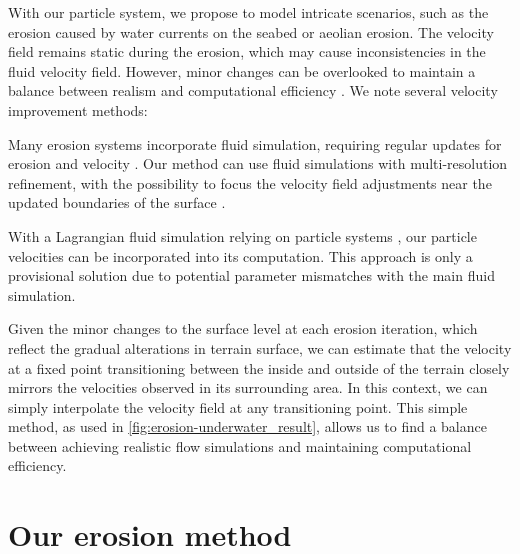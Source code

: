 
With our particle system, we propose to model intricate scenarios, such as the erosion caused by water currents on the seabed or aeolian erosion. The velocity field remains static during the erosion, which may cause inconsistencies in the fluid velocity field. However, minor changes can be overlooked to maintain a balance between realism and computational efficiency \cite{Tychonievich2010}. We note several velocity improvement methods: 
\begin{Itemize}
     Many erosion systems incorporate fluid simulation, requiring regular updates for erosion and velocity \cite{Kristof2009, Wojtan2007}. Our method can use fluid simulations with multi-resolution refinement, with the possibility to focus the velocity field adjustments near the updated boundaries of the surface \cite{Roose2011}. 
    
     With a Lagrangian fluid simulation relying on particle systems \cite{Koschier2022}, our particle velocities can be incorporated into its computation. This approach is only a provisional solution due to potential parameter mismatches with the main fluid simulation. 

     Given the minor changes to the surface level at each erosion iteration, which reflect the gradual alterations in terrain surface, we can estimate that the velocity at a fixed point transitioning between the inside and outside of the terrain closely mirrors the velocities observed in its surrounding area. In this context, we can simply interpolate the velocity field at any transitioning point. This simple method, as used in \cref{fig:erosion-underwater_result}, allows us to find a balance between achieving realistic flow simulations and maintaining computational efficiency.
\end{Itemize}

\section{Our erosion method}
\label{sec:erosion-application-on-representations}


